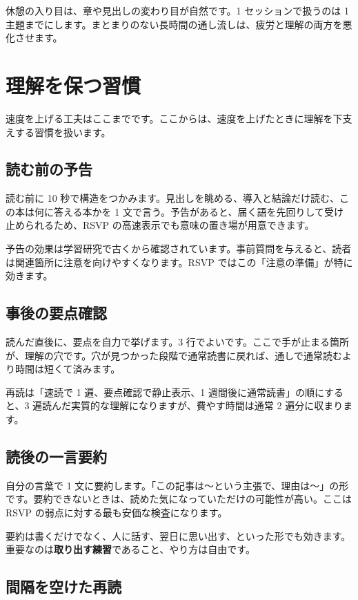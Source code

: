 \documentclass{article}
\begin{document}
休憩の入り目は、章や見出しの変わり目が自然です。1 セッションで扱うのは 1 主題までにします。まとまりのない長時間の通し流しは、疲労と理解の両方を悪化させます。

\section{理解を保つ習慣}

速度を上げる工夫はここまでです。ここからは、速度を上げたときに理解を下支えする習慣を扱います。

\subsection{読む前の予告}

読む前に 10 秒で構造をつかみます。見出しを眺める、導入と結論だけ読む、この本は何に答える本かを 1 文で言う。予告があると、届く語を先回りして受け止められるため、RSVP の高速表示でも意味の置き場が用意できます。

予告の効果は学習研究で古くから確認されています。事前質問を与えると、読者は関連箇所に注意を向けやすくなります。RSVP ではこの「注意の準備」が特に効きます。

\subsection{事後の要点確認}

読んだ直後に、要点を自力で挙げます。3 行でよいです。ここで手が止まる箇所が、理解の穴です。穴が見つかった段階で通常読書に戻れば、通しで通常読むより時間は短くて済みます。

再読は「速読で 1 遍、要点確認で静止表示、1 週間後に通常読書」の順にすると、3 遍読んだ実質的な理解になりますが、費やす時間は通常 2 遍分に収まります。

\subsection{読後の一言要約}

自分の言葉で 1 文に要約します。「この記事は〜という主張で、理由は〜」の形です。要約できないときは、読めた気になっていただけの可能性が高い。ここは RSVP の弱点に対する最も安価な検査になります。

要約は書くだけでなく、人に話す、翌日に思い出す、といった形でも効きます。重要なのは\textbf{取り出す練習}であること、やり方は自由です。

\subsection{間隔を空けた再読}
\end{document}
